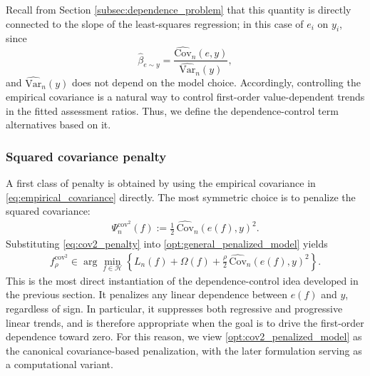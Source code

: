 \documentclass[12pt, draft]{article}
\theoremstyle{plain}
\theoremstyle{definition}
\newcommand{\1}{\mathbf{1}}
\newcommand{\Cov}{\text{Cov}}
\newcommand{\Var}{\text{Var}}
\renewcommand{\H}{\mathcal{H}}
\begin{document}
{Recall from Section \ref{subsec:dependence_problem} that this quantity is directly connected to the slope of the least-squares regression; in this case of $e_i$ on $y_i$, since
\[
\widehat{\beta}_{e\sim y}
=
\frac{\widehat{\Cov}_n(e,y)}{\widehat{\Var}_n(y)},
\]
and $\widehat{\Var}_n(y)$ does not depend on the model choice. Accordingly, controlling the empirical covariance is a natural way to control first-order value-dependent trends in the fitted assessment ratios. Thus, we define the dependence-control term alternatives based on it.


\subsubsection{Squared covariance penalty}

A first class of penalty is obtained by using the empirical covariance in \eqref{eq:empirical_covariance} directly.
The most symmetric choice is to penalize the squared covariance:
\begin{align}
    \label{eq:cov2_penalty}
    \Psi_n^{\mathrm{cov}^2}(f)
    :=
    \frac{1}{2}\,
    \widehat{\Cov}_n(e(f),y)^2.
\end{align}
Substituting \eqref{eq:cov2_penalty} into \eqref{opt:general_penalized_model} yields
\begin{align}
    \label{opt:cov2_penalized_model}
    f_{\rho}^{\mathrm{cov}^2}
    \in
    \arg\min_{f\in\H}
    \left\{
        L_n(f)+\Omega(f)
        +
        \frac{\rho}{2}\,\widehat{\Cov}_n(e(f),y)^2
    \right\}.
\end{align}
This is the most direct instantiation of the dependence-control idea developed in the previous section. It penalizes any linear dependence between $e(f)$ and $y$, regardless of sign. In particular, it suppresses both regressive and progressive linear trends, and is therefore appropriate when the goal is to drive the first-order dependence toward zero. For this reason, we view \eqref{opt:cov2_penalized_model} as the canonical covariance-based penalization, with the later formulation serving as a computational variant.

}
\end{document}
